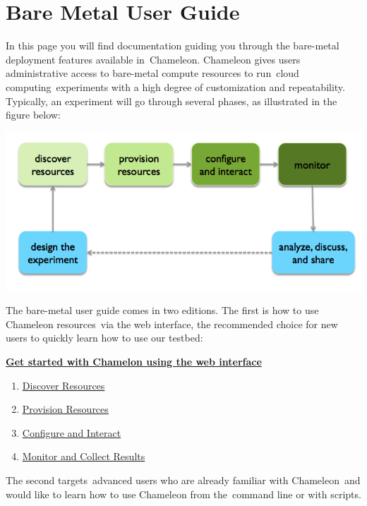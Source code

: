 \FILENAME

\chapter{Bare Metal User Guide}\label{bare-metal-user-guide}

In this page you will find documentation guiding you through the
bare-metal deployment features available in~Chameleon. Chameleon gives
users administrative access to bare-metal compute resources to
run~{cloud computing~}experiments with a high degree of customization
and repeatability. Typically, an experiment will go through several
phases, as illustrated in the figure below:

{
\includegraphics[width=\columnwidth]{images/chameleon/baremetal.png}
}

The bare-metal user guide comes in two editions. The first is how to use
Chameleon resources~via the web interface, the recommended choice for
new users to quickly learn how to use our testbed:

\textbf{\href{https://www.chameleoncloud.org/discover-resources}{Get
started with Chamelon using the web interface}}

\begin{enumerate}
\tightlist
\item
  \href{https://www.chameleoncloud.org/discover-resources/}{Discover
  Resources}
\item
  \href{https://www.chameleoncloud.org/provision-resources/}{Provision
  Resources}~
\item
  \href{https://www.chameleoncloud.org/configure-and-interact/}{Configure
  and Interact}
\item
  \href{https://www.chameleoncloud.org/monitor-and-collect/}{Monitor and
  Collect Results}
\end{enumerate}

The second targets~advanced users who are already familiar with
Chameleon~and would like to learn how to use Chameleon from the~command
line or with scripts.

